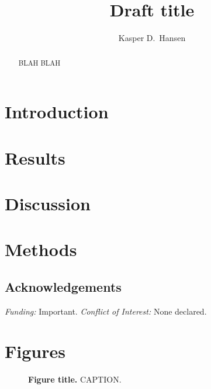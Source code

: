 \documentclass[pdftex,english,12pt]{article}
\begin{document}
\title{Draft title}

\author[1,2,*]{Kasper D.\ Hansen}

\date{}
\maketitle

\begin{abstract}
  \noindent 
  BLAH BLAH
\end{abstract}

\clearpage

\section*{Introduction}

\section*{Results}

\section*{Discussion}

\section*{Methods}

\subsection*{Acknowledgements}

\emph{Funding:} Important.
\emph{Conflict of Interest:} None declared.

\clearpage

\printbibliography[title=Bibliography]

\clearpage

\section*{Figures}

\begin{figure}[h!]
  \centering
  \caption{\textbf{Figure title.}  CAPTION.}
  \label{fig:example}
\end{figure}
\end{document}
